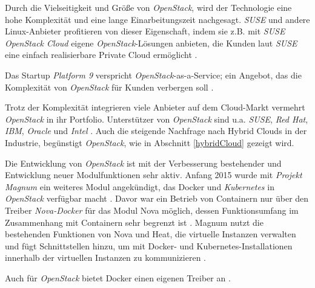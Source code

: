 \documentclass[../main.tex]{subfiles}
\begin{document}
      Durch die Vielseitigkeit und Größe von \emph{OpenStack}, wird der Technologie eine hohe Komplexität und eine lange Einarbeitungszeit nachgesagt. \emph{SUSE} und andere Linux-Anbieter profitieren von dieser Eigenschaft, indem sie z.B. mit \emph{SUSE OpenStack Cloud} eigene \emph{OpenStack}-Lösungen anbieten, die Kunden laut \emph{SUSE} eine einfach realisierbare Private Cloud ermöglicht \cite{SusePrivateCloud}\cite[S.2,4]{golemOpenStack}.

      Das Startup \emph{Platform 9} verspricht \emph{OpenStack}-as-a-Service; ein Angebot, das die Komplexität von \emph{OpenStack} für Kunden verbergen soll \cite{platform9}.

      Trotz der Komplexität integrieren viele Anbieter auf dem Cloud-Markt vermehrt \emph{OpenStack} in ihr Portfolio. Unterstützer von \emph{OpenStack} sind u.a. \emph{SUSE}, \emph{Red Hat}, \emph{IBM}, \emph{Oracle} und \emph{Intel} \cite{heiseOpenStack}\cite{IBMDockerOpenStack}. Auch die steigende Nachfrage nach Hybrid Clouds in der Industrie, begünstigt \emph{OpenStack}, wie in Abschnitt \ref{hybridCloud} gezeigt wird.

      Die Entwicklung von \emph{OpenStack} ist mit der Verbesserung bestehender und Entwicklung neuer Modulfunktionen sehr aktiv. Anfang 2015 wurde mit \emph{Projekt Magnum} ein weiteres Modul angekündigt, das Docker und \emph{Kubernetes} in \emph{OpenStack} verfügbar macht \cite{openStackMagnum}. Davor war ein Betrieb von Containern nur über den Treiber \emph{Nova-Docker} für das Modul Nova möglich, dessen Funktionsumfang im Zusammenhang mit Containern sehr begrenzt ist \cite{heiseOpenStackContainer}\cite{openStackDocker}.
      Magnum nutzt die bestehenden Funktionen von Nova und Heat, die virtuelle Instanzen verwalten und fügt Schnittstellen hinzu, um mit Docker- und Kubernetes-Installationen innerhalb der virtuellen Instanzen zu kommunizieren \cite{openStackMagnum}.


      Auch für \emph{OpenStack} bietet Docker einen eigenen Treiber an \cite{dockerMachineDriverOpenStack}.

\end{document}
